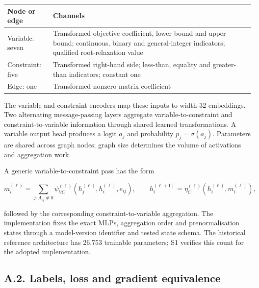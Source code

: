 \documentclass[
  british,
  10pt,
]{article}
\newcounter{none} %
\begin{document}
{\def\LTcaptype{none} %
\begin{longtable}[]{@{}
  >{\raggedright\arraybackslash}p{}
  >{\raggedright\arraybackslash}p{}@{}}
\toprule\noalign{}
\begin{minipage}[b]{\linewidth}\raggedright
Node or edge
\end{minipage} & \begin{minipage}[b]{\linewidth}\raggedright
Channels
\end{minipage} \\
\midrule\noalign{}
\endhead
\bottomrule\noalign{}
\endlastfoot
Variable: seven & Transformed objective coefficient, lower bound and
upper bound; continuous, binary and general-integer indicators;
qualified root-relaxation value \\
Constraint: five & Transformed right-hand side; less-than, equality and
greater-than indicators; constant one \\
Edge: one & Transformed nonzero matrix coefficient \\
\end{longtable}
}

The variable and constraint encoders map these inputs to width-32
embeddings. Two alternating message-passing layers aggregate
variable-to-constraint and constraint-to-variable information through
shared learned transformations. A variable output head produces a logit
\(a_j\) and probability \(p_j=\sigma(a_j)\). Parameters are shared
across graph nodes; graph size determines the volume of activations and
aggregation work.

A generic variable-to-constraint pass has the form

\[
m_i^{(\ell)}=\sum_{j:A_{ij}\ne0}
\psi_{VC}^{(\ell)}(h_j^{(\ell)},h_i^{(\ell)},e_{ij}),
\qquad
h_i^{(\ell+1)}=\eta_C^{(\ell)}(h_i^{(\ell)},m_i^{(\ell)}),
\tag{A.1}
\]

followed by the corresponding constraint-to-variable aggregation. The
implementation fixes the exact MLPs, aggregation order and
prenormalisation states through a model-version identifier and tested
state schema. The historical reference architecture has 26,753 trainable
parameters; S1 verifies this count for the adopted implementation.

\subsection{A.2. Labels, loss and gradient
equivalence}\label{a.2.-labels-loss-and-gradient-equivalence}
\end{document}
